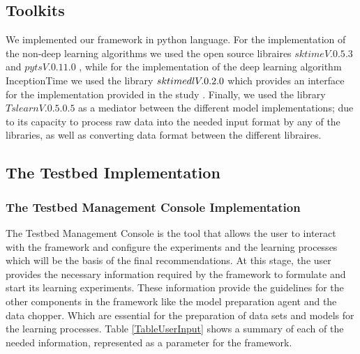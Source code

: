 

\subsection{Toolkits}
\label{SubsectionToolkits}
We implemented our framework in python language.
For the implementation of the non-deep learning algorithms we used the open source libraires $sktime V. 0.5.3$ \cite{loning2019sktime} and $pyts V. 0.11.0$ \cite{JMLR:v21:19-763},
while for the implementation of the deep learning algorithm InceptionTime we used the library $sktime\-dl V .0.2.0$ which provides an interface for the implementation provided
in the study \cite{fawaz2020inceptiontime}. Finally, we used the library $Tslearn V. 0.5.0.5$ \cite{JMLR:v21:20-091} as a mediator between the different model implementations; due to its
capacity to process raw data into the needed input format by any of the libraries, as well as converting data format between the different libraires.

\subsection{The Testbed Implementation}
\label{SubsectionTestbedImplementation}

\subsubsection{The Testbed Management Console Implementation}
\label{SubsectionTestbedManagementConsoleImplementation}
The Testbed Management Console is the tool that allows the user to interact with the framework and configure the experiments
and the learning processes which will be the basis of the final recommendations.
At this stage, the user provides the necessary information required by the framework to formulate and start its learning experiments.
These information provide the guidelines for the other components in the framework like the model preparation agent and the data chopper.
Which are essential for the preparation of data sets and models for the learning processes.
Table \ref{TableUserInput} shows a summary of each of the needed information, represented as a parameter for the framework.

